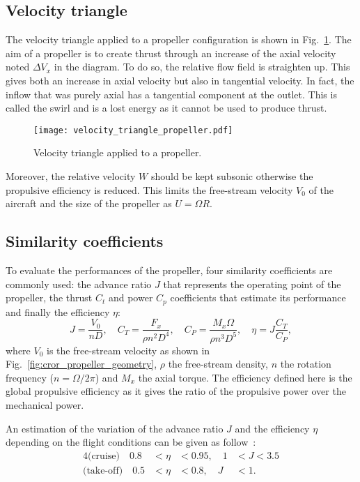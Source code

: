 \subsection{Velocity triangle}
\label{sub:cror_propeller_velocity_triangle}
The velocity triangle applied to a propeller configuration
is shown in Fig.~\ref{fig:cror_velocity_triangle_propeller}.
The aim of a propeller is to create thrust through an increase
of the axial velocity noted $\Delta V_x$ in the diagram. To do
so, the relative flow field is straighten up. This gives both
an increase in axial velocity but also in tangential velocity.
In fact, the inflow that was purely axial has a tangential
component at the outlet. This is called the swirl and
is a lost energy as it cannot be used to produce thrust.
\begin{figure}
  \centering
  \texttt{[image: velocity\_triangle\_propeller.pdf]}
  \caption{Velocity triangle applied to a propeller.}
  \label{fig:cror_velocity_triangle_propeller}
\end{figure}
Moreover, the relative velocity $W$ should be kept subsonic
otherwise the propulsive efficiency is reduced. This limits
the free-stream velocity $V_0$ of the aircraft and the size of 
the propeller as $U = \Omega R$.

\subsection{Similarity coefficients}
\label{sub:similarity_coefficients}
To evaluate the performances of the propeller, four similarity
coefficients are commonly used:
the advance ratio $J$ that represents the operating point of the propeller,
the thrust $C_t$ and power $C_p$ coefficients that estimate its performance and finally
the efficiency $\eta$:
\begin{equation}
    J = \frac{V_0}{n D}, \quad
    C_T = \frac{F_x}{\rho n ^ 2  D ^ 4}, \quad
    C_P = \frac{M_x \Omega}{\rho n ^ 3 D ^ 5}, \quad
    \eta = J \frac{C_T}{C_P},
\end{equation}
where $V_0$ is the free-stream velocity 
as shown in Fig.~\ref{fig:cror_propeller_geometry},
$\rho$ the free-stream density,
$n$ the rotation frequency ($n = \Omega / 2 \pi$) and
$M_x$ the axial torque.
The efficiency defined here is the global propulsive efficiency
as it gives the ratio of the propulsive power over the mechanical power.

An estimation of the variation of the advance ratio $J$ and the 
efficiency $\eta$ depending on the flight conditions can be given as follow~\cite{Bousquet2012}:
\begin{alignat}{4}
    \text{(cruise)} \quad  0.8 &< \eta &< 0.95, \quad 1 &< J < 3.5 \\
    \text{(take-off)} \quad  0.5 &< \eta &< 0.8, \quad J &< 1.
    \label{eq:estimation_sim_coeff}
\end{alignat}

